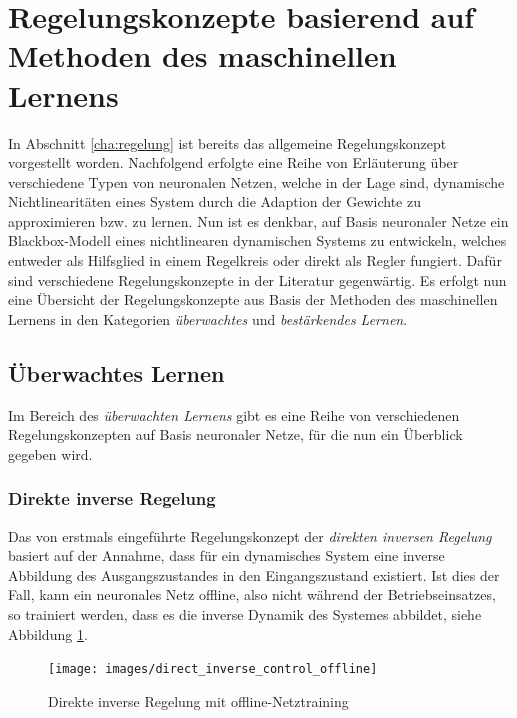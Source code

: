 \section{Regelungskonzepte basierend auf Methoden des maschinellen Lernens}

In Abschnitt \ref{cha:regelung} ist bereits das allgemeine Regelungskonzept vorgestellt worden. Nachfolgend erfolgte eine Reihe von Erläuterung über verschiedene Typen von neuronalen Netzen, welche in der Lage sind, dynamische Nichtlinearitäten eines System durch die Adaption der Gewichte zu approximieren bzw. zu lernen. Nun ist es denkbar, auf Basis neuronaler Netze ein Blackbox-Modell eines nichtlinearen dynamischen Systems zu entwickeln, welches entweder als Hilfsglied in einem Regelkreis oder direkt als Regler fungiert. Dafür sind verschiedene Regelungskonzepte in der Literatur gegenwärtig. Es erfolgt nun eine Übersicht der Regelungskonzepte aus Basis der Methoden des maschinellen Lernens in den Kategorien \textit{überwachtes} und \textit{bestärkendes Lernen}.\\


\subsection{Überwachtes Lernen} 

Im Bereich des \textit{überwachten Lernens} gibt es eine Reihe von verschiedenen Regelungskonzepten auf Basis neuronaler Netze, für die nun ein Überblick gegeben wird.


\subsubsection{Direkte inverse Regelung}
\label{cha:direct_inverse}
Das von \cite{Werbos.2014} erstmals eingeführte Regelungskonzept der \textit{direkten inversen Regelung} basiert auf der Annahme, dass für ein dynamisches System eine inverse Abbildung des Ausgangszustandes in den Eingangszustand existiert.  Ist dies der Fall, kann ein neuronales Netz offline, also nicht während der Betriebseinsatzes, so trainiert werden, dass es die inverse Dynamik des Systemes abbildet, siehe Abbildung \ref{fig:direct_inverse_offline}. \\ 

\begin{figure} [h]
	\centering
	\texttt{[image: images/direct\_inverse\_control\_offline]}
	\caption{Direkte inverse Regelung mit offline-Netztraining \cite{Sklyarenko.2002}}
	\label{fig:direct_inverse_offline}
\end{figure}

